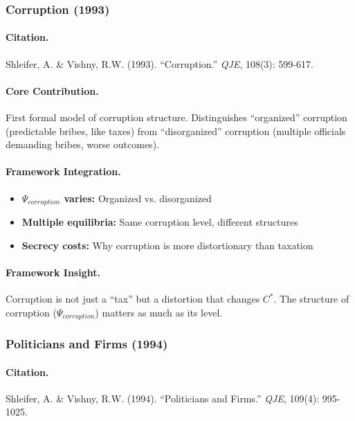\subsubsection{Corruption (1993)}

\paragraph{Citation.}
Shleifer, A. \& Vishny, R.W. (1993).
``Corruption.'' \emph{QJE}, 108(3): 599-617.

\paragraph{Core Contribution.}
First formal model of corruption structure. Distinguishes ``organized''
corruption (predictable bribes, like taxes) from ``disorganized'' corruption
(multiple officials demanding bribes, worse outcomes).

\paragraph{Framework Integration.}
\begin{itemize}
  \item \textbf{$\Psi_{corruption}$ varies:} Organized vs. disorganized
  \item \textbf{Multiple equilibria:} Same corruption level, different structures
  \item \textbf{Secrecy costs:} Why corruption is more distortionary than taxation
\end{itemize}

\paragraph{Framework Insight.}
Corruption is not just a ``tax'' but a distortion that changes $C^*$.
The structure of corruption ($\Psi_{corruption}$) matters as much as its level.

\subsubsection{Politicians and Firms (1994)}

\paragraph{Citation.}
Shleifer, A. \& Vishny, R.W. (1994).
``Politicians and Firms.'' \emph{QJE}, 109(4): 995-1025.

